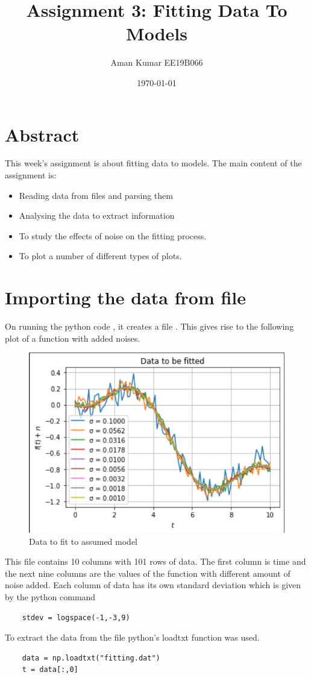 \documentclass[11pt, a4paper]{article}
\title{Assignment 3: Fitting Data To Models} %
\author{Aman Kumar EE19B066} %
\date{\today} %
\begin{document}
	
		
\maketitle %
\section{Abstract}
This week's assignment is about fitting data to models.
The main content of the assignment is: 
\begin{itemize}
    \item Reading data from files and parsing them
    \item Analysing the data to extract information
    \item To study the effects of noise on the fitting process.
    \item To plot a number of different types of plots. 
\end{itemize}

\section{Importing the data from file}
On running the python code \textit{}, it creates a file \textit{}. This gives rise to the following plot of a function with added noises.

\begin{figure}[h]
   	\centering
   	\includegraphics[scale=0.6]{Data to fit.png}   
   	\caption{Data to fit to assumed model}
   	\label{fig:Figure 0}
\end{figure} 
   This file contains 10 columns with 101 rows of data. The first column is time and the next nine columns are the values of the function with different amount of noise added. Each column of data has its own standard deviation which is given by the python command
\begin{verbatim}	
    stdev = logspace(-1,-3,9)
\end{verbatim}
To extract the data from the \textit{} file python's loadtxt function was used.
\begin{verbatim}
    data = np.loadtxt("fitting.dat")
    t = data[:,0]
\end{verbatim}
\end{document}
